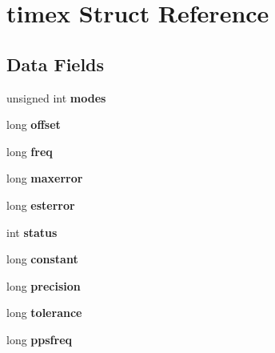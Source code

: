 \hypertarget{structtimex}{}\section{timex Struct Reference}
\label{structtimex}
\subsection*{Data Fields}
\begin{DoxyCompactItemize}
\item 
\mbox{\label{structtimex_ab8e9ae426d0cf972b8133f1c8af5d7a7}} 
unsigned int {\bfseries modes}
\item 
\mbox{\label{structtimex_a3eb461d5664b8186efada5b830b413ab}} 
long {\bfseries offset}
\item 
\mbox{\label{structtimex_a332dccdeffc4f47c0e44549b5e9adee1}} 
long {\bfseries freq}
\item 
\mbox{\label{structtimex_a80108b1176487bcebc54a35ed99a77cc}} 
long {\bfseries maxerror}
\item 
\mbox{\label{structtimex_abe9847ee029aa04c0e0a43c0e5714f69}} 
long {\bfseries esterror}
\item 
\mbox{\label{structtimex_a7cd7a7465c8c01e42fb46e6abb42597b}} 
int {\bfseries status}
\item 
\mbox{\label{structtimex_a7d2bffeac2b8e7e11755380bad9091db}} 
long {\bfseries constant}
\item 
\mbox{\label{structtimex_ae1647a0011396e72a11b2bffa18b42f9}} 
long {\bfseries precision}
\item 
\mbox{\label{structtimex_acc40f7b67544fef306e004e7cce993f6}} 
long {\bfseries tolerance}
\item 
\mbox{\label{structtimex_adf1bc45193dde6fd6c34e0b3db8dca91}} 
long {\bfseries ppsfreq}
\item 
\mbox{\label{structtimex_a21d6edbf815143189261d22856f27de5}} 

\end{DoxyCompactItemize}
